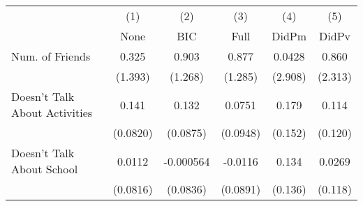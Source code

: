 {
\def\sym#1{\ifmmode^{#1}\else\(^{#1}\)\fi}
\begin{tabular}{l*{5}{c}}
\toprule
            &\multicolumn{1}{c}{(1)}&\multicolumn{1}{c}{(2)}&\multicolumn{1}{c}{(3)}&\multicolumn{1}{c}{(4)}&\multicolumn{1}{c}{(5)}\\
            &\multicolumn{1}{c}{None}&\multicolumn{1}{c}{BIC}&\multicolumn{1}{c}{Full}&\multicolumn{1}{c}{DidPm}&\multicolumn{1}{c}{DidPv}\\
\midrule
Num. of Friends&       0.325         &       0.903         &       0.877         &      0.0428         &       0.860         \\
            &     (1.393)         &     (1.268)         &     (1.285)         &     (2.908)         &     (2.313)         \\
\addlinespace
Doesn't Talk About Activities&       0.141         &       0.132         &      0.0751         &       0.179         &       0.114         \\
            &    (0.0820)         &    (0.0875)         &    (0.0948)         &     (0.152)         &     (0.120)         \\
\addlinespace
Doesn't Talk About School&      0.0112         &   -0.000564         &     -0.0116         &       0.134         &      0.0269         \\
            &    (0.0816)         &    (0.0836)         &    (0.0891)         &     (0.136)         &     (0.118)         \\
\bottomrule
\end{tabular}
}
